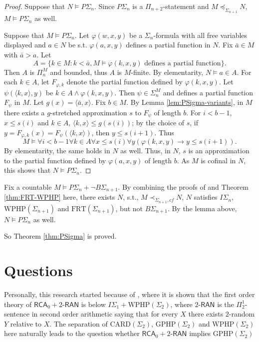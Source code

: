 \documentclass[twoside,a4paper]{amsart}
\theoremstyle{definition}
\theoremstyle{theorem}
\numberwithin{equation}{section}
\newcommand{\<}{\langle}
\renewcommand{\>}{\rangle}
\newcommand{\RCA}{\mathsf{RCA}}
\newcommand{\RAN}{\mathsf{RAN}}
\newcommand{\CARD}{\mathrm{CARD}}
\newcommand{\WPHP}{\mathrm{WPHP}}
\newcommand{\GPHP}{\mathrm{GPHP}}
\newcommand{\FRT}{\mathrm{FRT}}
\begin{document}
\begin{proof}
Suppose that $N \models P\Sigma_n$.
Since $P\Sigma_n$ is a $\Pi_{n+2}$-statement and $M \preceq_{\Sigma_{n+1}} N$,
 $M \models P\Sigma_n$ as well.

Suppose that $M \models P\Sigma_n$.
Let $\varphi(w,x,y)$ be a $\Sigma_n$-formula with all free variables displayed and $a \in N$ be s.t. $\varphi(a,x,y)$ defines a partial function in $N$.
Fix $\bar{a} \in M$ with $\bar{a} > a$.
Let
\[
  A = \{k \in M: k < \bar{a}, M \models \varphi(k,x,y) \text{ defines a partial function}\}.
\]
Then $A$ is $\Pi_n^M$ and bounded, thus $A$ is $M$-finite.
By elementarity, $N \models a \in A$.
For each $k \in A$, let $F_{\varphi,k}$ denote the partial function defined by $\varphi(k,x,y)$.
Let $\psi(\<k,x\>,y)$ be $k \in A \wedge \varphi(k,x,y)$.
Then $\psi \in \Sigma_n^M$ and defines a partial function $F_\psi$ in $M$.
Let $g(x) = \<\bar{a},x\>$.
Fix $b \in M$.
By Lemma \ref{lem:PSigma-variants}, in $M$ there exists a $g$-stretched approximation $s$ to $F_\psi$ of length $b$.
For $i < b-1$, $x \leq s(i)$ and $k \in A$, $\<k,x\> \leq g(s(i))$;
by the choice of $s$, if $y = F_{\varphi,k}(x) = F_\psi(\<k,x\>)$, then $y \leq s(i+1)$.
Thus
\[
  M \models \forall i < b-1 \forall k \in A \forall x \leq s(i) \forall y
  (\varphi(k,x,y) \to y \leq s(i+1)).
\]
By elementarity, the same holds in $N$ as well.
Thus, in $N$, $s$ is an approximation to the partial function defined by $\varphi(a,x,y)$ of length $b$.
As $M$ is cofinal in $N$, this shows that $N \models P\Sigma_n$.
\end{proof}

Fix a countable $M \models P\Sigma_n + \neg B\Sigma_{n+1}$.
By combining the proofs of \cite[Theorem 5.10]{BCWWY:2021} and Theorem \ref{thm:FRT-WPHP} here,
there exists $N$, s.t., $M \prec_{\Sigma_{n+1},cf} N$, $N$ satisfies $I\Sigma_n$, $\WPHP(\Sigma_{n+1})$ and $\FRT(\Sigma_{n+1})$, but not $B\Sigma_{n+1}$.
By the lemma above, $N \models P\Sigma_n$ as well.

So Theorem \ref{thm:PSigma} is proved.

\section{Questions}

Personally, this research started because of \cite{BCWWY:2021},
where it is shown that the first order theory of $\RCA_0 + 2\text{-}\RAN$ is below $I\Sigma_1 + \WPHP(\Sigma_2)$,
where $2\text{-}\RAN$ is the $\Pi^1_2$-sentence in second order arithmetic saying that for every $X$ there exists $2$-random $Y$ relative to $X$.
The separation of $\CARD(\Sigma_2)$, $\GPHP(\Sigma_2)$ and $\WPHP(\Sigma_2)$ here naturally leads to the question whether $\RCA_0 + 2\text{-}\RAN$ implies $\GPHP(\Sigma_2)$
\end{document}
